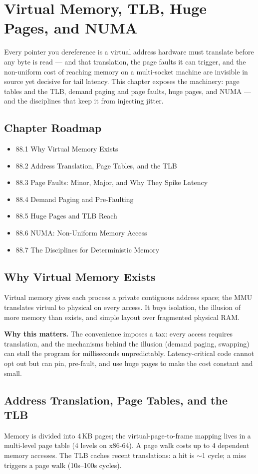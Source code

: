 \chapter{Virtual Memory, TLB, Huge Pages, and NUMA}

Every pointer you dereference is a virtual address hardware must translate before any byte is read --- and that translation, the page faults it can trigger, and the non-uniform cost of reaching memory on a multi-socket machine are invisible in source yet decisive for tail latency. This chapter exposes the machinery: page tables and the TLB, demand paging and page faults, huge pages, and NUMA --- and the disciplines that keep it from injecting jitter.

\section*{Chapter Roadmap}
\begin{itemize}
\item 88.1 Why Virtual Memory Exists
\item 88.2 Address Translation, Page Tables, and the TLB
\item 88.3 Page Faults: Minor, Major, and Why They Spike Latency
\item 88.4 Demand Paging and Pre-Faulting
\item 88.5 Huge Pages and TLB Reach
\item 88.6 NUMA: Non-Uniform Memory Access
\item 88.7 The Disciplines for Deterministic Memory
\end{itemize}

\section{Why Virtual Memory Exists}
Virtual memory gives each process a private contiguous address space; the MMU translates virtual to physical on every access. It buys isolation, the illusion of more memory than exists, and simple layout over fragmented physical RAM.

\textbf{Why this matters.} The convenience imposes a tax: every access requires translation, and the mechanisms behind the illusion (demand paging, swapping) can stall the program for milliseconds unpredictably. Latency-critical code cannot opt out but can pin, pre-fault, and use huge pages to make the cost constant and small.

\section{Address Translation, Page Tables, and the TLB}
Memory is divided into 4\,KB pages; the virtual-page-to-frame mapping lives in a multi-level page table (4 levels on x86-64). A page walk costs up to 4 dependent memory accesses. The TLB caches recent translations: a hit is $\sim$1 cycle; a miss triggers a page walk (10s--100s cycles).

